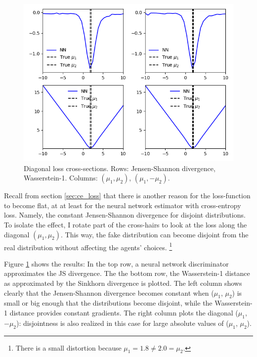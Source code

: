 \begin{figure}
    \includegraphics[width=\textwidth]{./Images/diagonal_loss_plots CE wasserstein-1.png} %
    \caption{Diagonal loss cross-sections. Rows: Jensen-Shannon divergence, Wasserstein-1. Columns: $(\mu_1, \mu_2)$, $(\mu_1, -\mu_2)$.}
    \label{fig:diagonal_loss_plots}
\end{figure}

Recall from section \ref{sec:ce_loss} that there is another reason for the loss-function to become flat,
at at least for the neural network estimator with cross-entropy loss.
Namely, the constant Jensen-Shannon divergence for disjoint distributions.
To isolate the effect, I rotate part of the cross-hairs to look at the loss along the diagonal $(\mu_1, \mu_2)$.
This way, the fake distribution can become disjoint from the real distribution without affecting the agents' choices.
\footnote{There is a small distortion because $\mu_1 = 1.8 \neq 2.0 = \mu_2$.}

Figure \ref{fig:diagonal_loss_plots} shows the results:
In the top row, a neural network discriminator approximates the JS divergence.
The the bottom row, the Wasserstein-1 distance as approximated by the Sinkhorn divergence is plotted.
The left column shows clearly that the Jensen-Shannon divergence becomes constant when ($\mu_1$, $\mu_2$) is small or big enough that the distributions become disjoint, while the Wasserstein-1 distance provides constant gradients.
The right column plots the diagonal ($\mu_1$, $-\mu_2$): disjointness is also realized in this case for large absolute values of ($\mu_1$, $\mu_2$).

